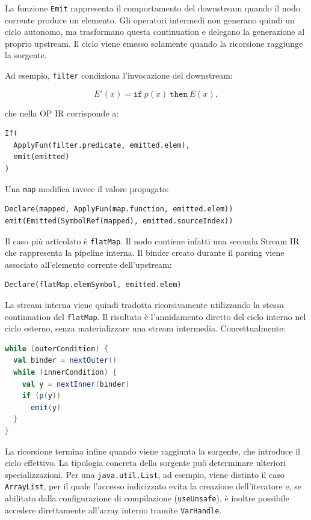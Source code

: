 \documentclass[a4paper,11pt]{report}
\theoremstyle{definition}
\begin{document}
La funzione \texttt{Emit} rappresenta il comportamento del downstream quando il nodo corrente produce un elemento. Gli operatori intermedi non generano quindi un ciclo autonomo, ma trasformano questa continuation e delegano la generazione al proprio upstream. Il ciclo viene emesso solamente quando la ricorsione raggiunge la sorgente.

Ad esempio, \texttt{filter} condiziona l'invocazione del downstream:

\[
  E'(x) =
  \texttt{if}\ p(x)\ \texttt{then}\ E(x),
\]

che nella OP IR corrisponde a:

\begin{lstlisting}[language=OPIR]
If(
  ApplyFun(filter.predicate, emitted.elem),
  emit(emitted)
)
\end{lstlisting}

Una \texttt{map} modifica invece il valore propagato:

\begin{lstlisting}[language=OPIR]
Declare(mapped, ApplyFun(map.function, emitted.elem))
emit(Emitted(SymbolRef(mapped), emitted.sourceIndex))
\end{lstlisting}

Il caso più articolato è \texttt{flatMap}. Il nodo contiene infatti una seconda Stream IR che rappresenta la pipeline interna. Il binder creato durante il parsing viene associato all'elemento corrente dell'upstream:

\begin{lstlisting}[language=OPIR]
Declare(flatMap.elemSymbol, emitted.elem)
\end{lstlisting}

La stream interna viene quindi tradotta ricorsivamente utilizzando la stessa continuation del \texttt{flatMap}. Il risultato è l'annidamento diretto del ciclo interno nel ciclo esterno, senza materializzare una stream intermedia. Concettualmente:

\begin{lstlisting}[language=Scala]
while (outerCondition) {
  val binder = nextOuter()
  while (innerCondition) {
    val y = nextInner(binder)
    if (p(y))
      emit(y)
  }
}
\end{lstlisting}

La ricorsione termina infine quando viene raggiunta la sorgente, che introduce il ciclo effettivo. La tipologia concreta della sorgente può determinare ulteriori specializzazioni. Per una \texttt{java.util.List}, ad esempio, viene distinto il caso \texttt{ArrayList}, per il quale l'accesso indicizzato evita la creazione dell'iteratore e, se abilitato dalla configurazione di compilazione (\texttt{useUnsafe}), è inoltre possibile accedere direttamente all'array interno tramite \texttt{VarHandle}.
\end{document}
